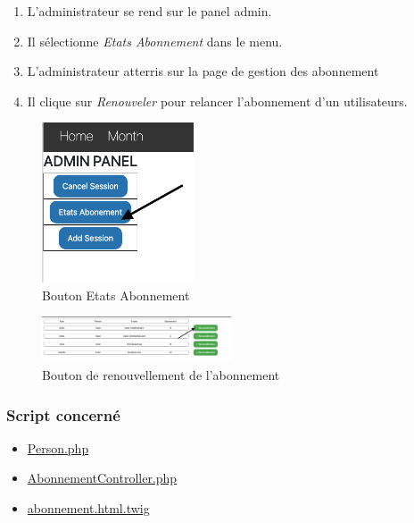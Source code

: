 \begin{enumerate}
	\item L'administrateur se rend sur le panel admin. 
	\item Il sélectionne \textit{Etats Abonnement} dans le menu. 
	\item L'administrateur atterris sur la page de gestion des abonnement 
	\item Il clique sur \textit{Renouveler} pour relancer l'abonnement d'un utilisateurs. 
\end{enumerate}

\begin{figure}[h]
	\includegraphics[width=0.4\textwidth,center]{Figures/us11-1}
	\caption{Bouton Etats Abonnement}
\end{figure}

\vspace{\baselineskip}
\vspace{\baselineskip}
\begin{figure}[h]
	\includegraphics[width=0.5\textwidth,center]{Figures/us11-2}
	\caption{Bouton de renouvellement de l'abonnement}
\end{figure}

\newpage
\subsubsection{Script concerné}
	\begin{itemize}
		\item \href{https://github.com/victorsmits/Aquabike/blob/master/Symfony-Twig/src/Entity/Person.php}{Person.php}
		\item \href{https://github.com/victorsmits/Aquabike/blob/master/Symfony-Twig/src/Controller/AbonnementController.php}{AbonnementController.php}
		\item \href{https://github.com/victorsmits/Aquabike/blob/master/Symfony-Twig/templates/create_session/abonnement.html.twig}{abonnement.html.twig}
	\end{itemize}